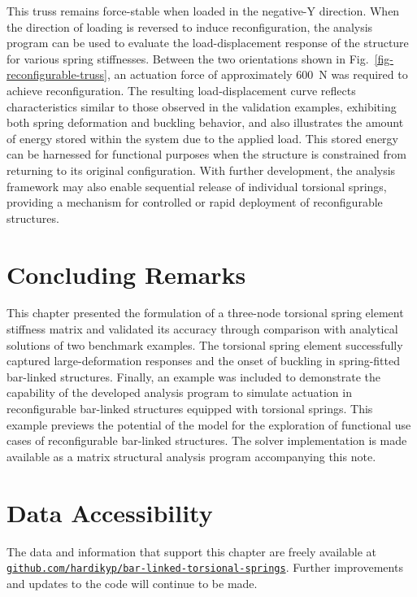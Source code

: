 This truss remains force-stable when loaded in the negative-Y direction. When the direction of loading is reversed to induce reconfiguration, the analysis program can be used to evaluate the load-displacement response of the structure for various spring stiffnesses. Between the two orientations shown in Fig.~\ref{fig-reconfigurable-truss}, an actuation force of approximately 600~N was required to achieve reconfiguration. The resulting load-displacement curve reflects characteristics similar to those observed in the validation examples, exhibiting both spring deformation and buckling behavior, and also illustrates the amount of energy stored within the system due to the applied load. This stored energy can be harnessed for functional purposes when the structure is constrained from returning to its original configuration. With further development, the analysis framework may also enable sequential release of individual torsional springs, providing a mechanism for controlled or rapid deployment of reconfigurable structures.

\section{Concluding Remarks}\label{03-sec-spring-conclusion}
This chapter presented the formulation of a three-node torsional spring element stiffness matrix and validated its accuracy through comparison with analytical solutions of two benchmark examples. The torsional spring element successfully captured large-deformation responses and the onset of buckling in spring-fitted bar-linked structures. Finally, an example was included to demonstrate the capability of the developed analysis program to simulate actuation in reconfigurable bar-linked structures equipped with torsional springs. This example previews the potential of the model for the exploration of functional use cases of reconfigurable bar-linked structures. The solver implementation is made available as a matrix structural analysis program accompanying this note.

\section{Data Accessibility}\label{03-sec-data}
The data and information that support this chapter are freely available at \href{http://www.github.com/hardikyp/}{\nolinkurl{github.com/hardikyp/bar-linked-torsional-springs}}. Further improvements and updates to the code will continue to be made.